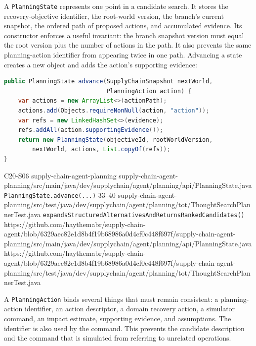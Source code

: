 \Needspace{0.58\textheight}

A \texttt{PlanningState} represents one point in a candidate search. It stores the recovery-objective identifier, the root-world version, the branch's current snapshot, the ordered path of proposed actions, and accumulated evidence. Its constructor enforces a useful invariant: the branch snapshot version must equal the root version plus the number of actions in the path. It also prevents the same planning-action identifier from appearing twice in one path. Advancing a state creates a new object and adds the action's supporting evidence:

\begin{minipage}{\linewidth}
\begin{lstlisting}[language=Java,caption={A planning transition creates a new path state rather than mutating the root.},label={lst:ch20-planning-state}]
public PlanningState advance(SupplyChainSnapshot nextWorld,
                             PlanningAction action) {
    var actions = new ArrayList<>(actionPath);
    actions.add(Objects.requireNonNull(action, "action"));
    var refs = new LinkedHashSet<>(evidence);
    refs.addAll(action.supportingEvidence());
    return new PlanningState(objectiveId, rootWorldVersion,
        nextWorld, actions, List.copyOf(refs));
}
\end{lstlisting}
\end{minipage}

\BookSourceReferenceNoQR
  {C20-S06}
  {supply-chain-agent-planning}
  {supply-chain-agent-planning/src/main/java/dev/supplychain/agent/planning/api/PlanningState.java}
  {\texttt{PlanningState.advance(...)}}
  {33--40}
  {supply-chain-agent-planning/src/test/java/dev/supplychain/agent/planning/tot/ThoughtSearchPlannerTest.java}
  {\texttt{expandsStructuredAlternativesAndReturnsRankedCandidates()}}
  {https://github.com/haythemabr/supply-chain-agent/blob/6329aec82e1d8b4f19b68986a0d4cf0c448f697f/supply-chain-agent-planning/src/main/java/dev/supplychain/agent/planning/api/PlanningState.java}
  {https://github.com/haythemabr/supply-chain-agent/blob/6329aec82e1d8b4f19b68986a0d4cf0c448f697f/supply-chain-agent-planning/src/test/java/dev/supplychain/agent/planning/tot/ThoughtSearchPlannerTest.java}

A \texttt{PlanningAction} binds several things that must remain consistent: a planning-action identifier, an action descriptor, a domain recovery action, a simulator command, an impact estimate, supporting evidence, and assumptions. The identifier is also used by the command. This prevents the candidate description and the command that is simulated from referring to unrelated operations.

